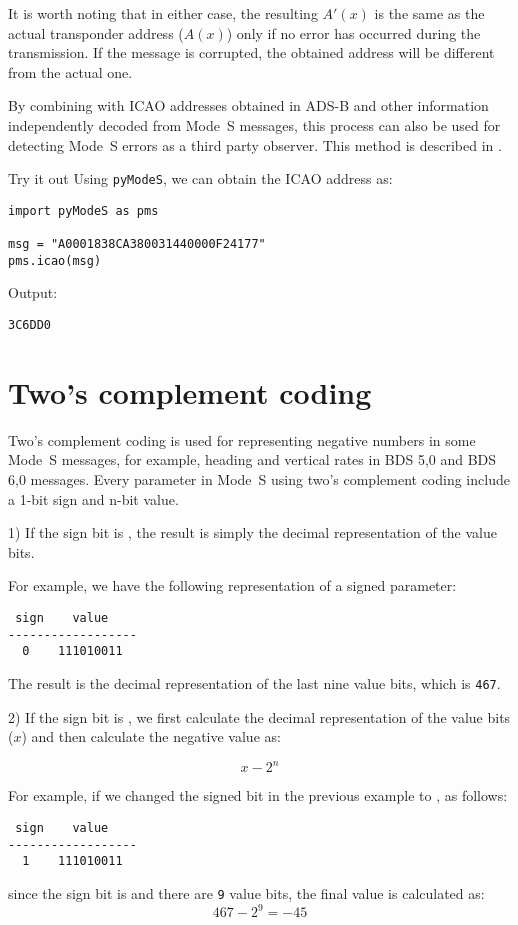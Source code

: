 It is worth noting that in either case, the resulting $A'(x)$ is the same as the actual transponder address ($A(x)$) only if no error has occurred during the transmission. If the message is corrupted, the obtained address will be different from the actual one.

By combining with ICAO addresses obtained in ADS-B and other information independently decoded from Mode~S messages, this process can also be used for detecting Mode~S errors as a third party observer. This method is described in \cite{sun2019pymodes}.

\begin{notebox}{Try it out}
Using \texttt{pyModeS}, we can obtain the ICAO address as: 

\begin{verbatim}
import pyModeS as pms

msg = "A0001838CA380031440000F24177"
pms.icao(msg)
\end{verbatim}

Output: 

\begin{verbatim}
3C6DD0
\end{verbatim}

\end{notebox}

\section{Two's complement coding} \label{sec:two_complement}

Two's complement coding is used for representing negative numbers in some Mode~S messages, for example, heading and vertical rates in BDS 5,0 and BDS 6,0 messages. Every parameter in Mode~S using two's complement coding include a 1-bit sign and n-bit value.

1) If the sign bit is \0, the result is simply the decimal representation of the value bits.

For example, we have the following representation of a signed parameter:

\begin{verbatim}
 sign    value
------------------
  0    111010011
\end{verbatim}

The result is the decimal representation of the last nine value bits, which is \texttt{467}.


2) If the sign bit is \1, we first calculate the decimal representation of the value bits ($x$) and then calculate the negative value as:

\begin{equation}
  x - 2^n
\end{equation}

For example, if we changed the signed bit in the previous example to \1, as follows:

\begin{verbatim}
 sign    value
------------------
  1    111010011
\end{verbatim}

since the sign bit is \1 and there are \texttt{9} value bits, the final value is calculated as:
\begin{equation}
  467 - 2^9 = -45
\end{equation}
